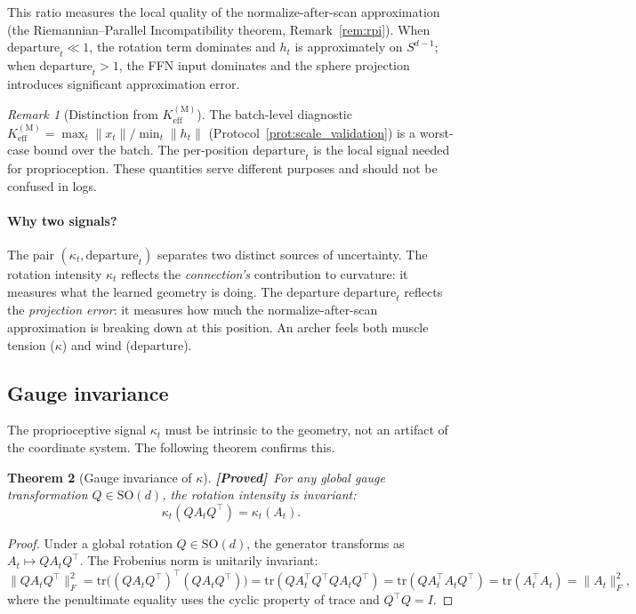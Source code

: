 \documentclass[11pt,a4paper]{article}
\newtheorem{theorem}{Theorem}[section]
\theoremstyle{definition}
\theoremstyle{remark}
\newtheorem{remark}[theorem]{Remark}
\newcommand{\SO}{\mathrm{SO}}
\newcommand{\statusproved}{\textcolor{green!50!black}{\textbf{[Proved]}}}
\begin{document}
This ratio measures the local quality of the normalize-after-scan 
approximation (the Riemannian--Parallel Incompatibility theorem, 
Remark~\ref{rem:rpi}). When $\mathrm{departure}_t \ll 1$, the 
rotation term dominates and $h_t$ is approximately on $S^{d-1}$; 
when $\mathrm{departure}_t > 1$, the FFN input dominates and the 
sphere projection introduces significant approximation error.

\begin{remark}[Distinction from $K_{\mathrm{eff}}^{(\mathrm{M})}$]
\label{rem:departure_vs_keff}
The batch-level diagnostic $K_{\mathrm{eff}}^{(\mathrm{M})} = 
\max_t \|x_t\| / \min_t \|h_t\|$ 
(Protocol~\ref{prot:scale_validation}) is a worst-case bound over 
the batch. The per-position $\mathrm{departure}_t$ is the local 
signal needed for proprioception. These quantities serve different 
purposes and should not be confused in logs.
\end{remark}

\paragraph{Why two signals?}
The pair $(\kappa_t, \mathrm{departure}_t)$ separates two distinct 
sources of uncertainty. The rotation intensity $\kappa_t$ reflects 
the \emph{connection's} contribution to curvature: it measures what 
the learned geometry is doing. The departure $\mathrm{departure}_t$ 
reflects the \emph{projection error}: it measures how much the 
normalize-after-scan approximation is breaking down at this position. 
An archer feels both muscle tension ($\kappa$) and wind 
($\mathrm{departure}$).

\subsection{Gauge invariance}\label{sec:proprio_gauge}

The proprioceptive signal $\kappa_t$ must be intrinsic to the 
geometry, not an artifact of the coordinate system. The following 
theorem confirms this.

\begin{theorem}[Gauge invariance of $\kappa$]\label{thm:gauge_kappa}
\statusproved\ For any global gauge transformation $Q \in \SO(d)$, 
the rotation intensity is invariant:
\[
    \kappa_t(Q A_t Q^\top) = \kappa_t(A_t).
\]
\end{theorem}

\begin{proof}
Under a global rotation $Q \in \SO(d)$, the generator transforms 
as $A_t \mapsto Q A_t Q^\top$. The Frobenius norm is unitarily 
invariant:
\[
    \|Q A_t Q^\top\|_F^2 
    = \mathrm{tr}\bigl((Q A_t Q^\top)^\top (Q A_t Q^\top)\bigr) 
    = \mathrm{tr}(Q A_t^\top Q^\top Q A_t Q^\top) 
    = \mathrm{tr}(Q A_t^\top A_t Q^\top) 
    = \mathrm{tr}(A_t^\top A_t) 
    = \|A_t\|_F^2,
\]
where the penultimate equality uses the cyclic property of trace 
and $Q^\top Q = I$.
\end{proof}
\end{document}
